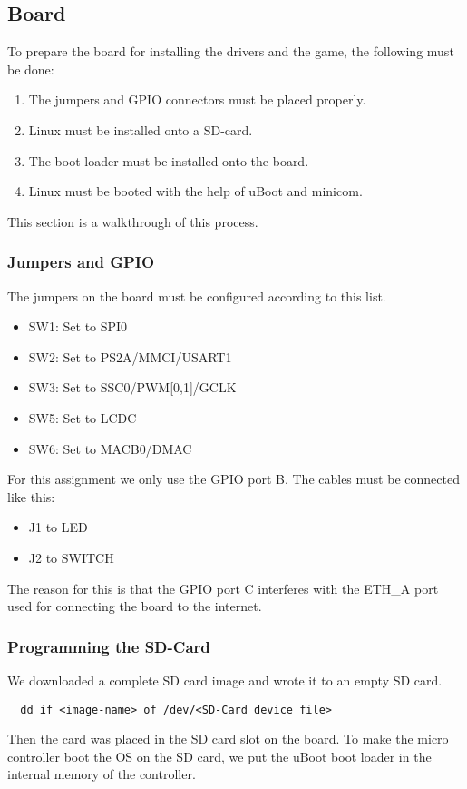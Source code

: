\subsection{Board}
\label{sec:boardsetup}

To prepare the board for installing the drivers and the game, the following must be done:
\begin{enumerate}
  \item The jumpers and GPIO connectors must be placed properly.
  \item Linux must be installed onto a SD-card.
  \item The boot loader must be installed onto the board.
  \item Linux must be booted with the help of uBoot and minicom.
\end{enumerate}

This section is a walkthrough of this process.

\subsubsection{Jumpers and GPIO}

The jumpers on the board must be configured according to this list.

\begin{itemize}
\item SW1: Set to SPI0
\item SW2: Set to PS2A/MMCI/USART1
\item SW3: Set to SSC0/PWM[0,1]/GCLK
\item SW5: Set to LCDC
\item SW6: Set to MACB0/DMAC
\end{itemize}

For this assignment we only use the GPIO port B. The cables must be connected like this:
\begin{itemize}
  \item J1 to LED
  \item J2 to SWITCH
\end{itemize}
The reason for this is that the GPIO port C interferes with the ETH\_A port used for connecting the board to
the internet.

\subsubsection{Programming the SD-Card}
We downloaded a complete SD card image and wrote it to an empty SD card.
\begin{verbatim}
  dd if <image-name> of /dev/<SD-Card device file>
\end{verbatim}
Then the card was placed in the SD card slot on the board. To make the micro controller boot
the OS on the SD card, we put the uBoot boot loader in the internal memory of the controller.

